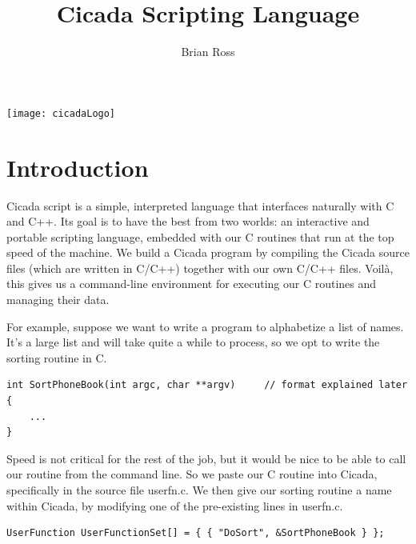 \documentclass{article}
\title{Cicada Scripting Language}
\author{Brian Ross}
\newenvironment{code}{
       \begin{list}{}{
               \setlength{\leftmargin}{.4in}
               \setlength{\rightmargin}{0in}
               \setlength{\topsep}{.2in}
       }
       \small
       \item[] }
       { \end{list}   }
\begin{document}
\maketitle
\vspace{.5in}
\begin{centering}
\texttt{[image: cicadaLogo]}\\
\end{centering}
\vspace{.5in}
\tableofcontents
\vspace{1.5in}
\newpage





\section{Introduction}

Cicada script is a simple, interpreted language that interfaces naturally with C and C++.  Its goal is to have the best from two worlds:  an interactive and portable scripting language, embedded with our C routines that run at the top speed of the machine.  We build a Cicada program by compiling the Cicada source files (which are written in C/C++) together with our own C/C++ files.  Voil\`a, this gives us a command-line environment for executing our C routines and managing their data.

For example, suppose we want to write a program to alphabetize a list of names.  It's a large list and will take quite a while to process, so we opt to write the sorting routine in C.

\begin{code} \begin{verbatim}
int SortPhoneBook(int argc, char **argv)     // format explained later
{
    ...
}
\end{verbatim} \end{code}
 
\noindent Speed is not critical for the rest of the job, but it would be nice to be able to call our routine from the command line.  So we paste our C routine into Cicada, specifically in the source file userfn.c.  We then give our sorting routine a name within Cicada, by modifying one of the pre-existing lines in userfn.c.

\begin{code} \begin{verbatim}
UserFunction UserFunctionSet[] = { { "DoSort", &SortPhoneBook } };
\end{verbatim} \end{code}
\end{document}

